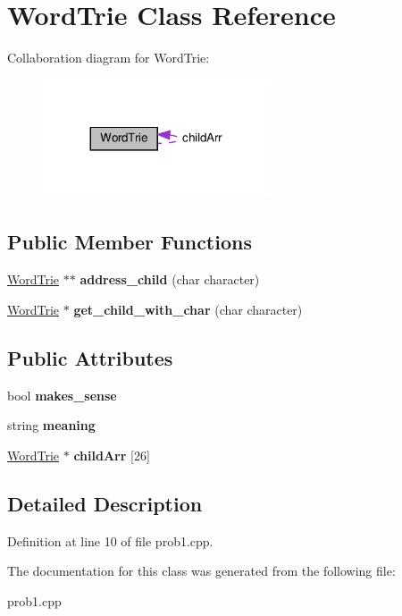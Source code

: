 \hypertarget{classWordTrie}{}\section{Word\+Trie Class Reference}
\label{classWordTrie}


Collaboration diagram for Word\+Trie\+:\nopagebreak
\begin{figure}[H]
\begin{center}
\leavevmode
\includegraphics[width=191pt]{classWordTrie__coll__graph}
\end{center}
\end{figure}
\subsection*{Public Member Functions}
\begin{DoxyCompactItemize}
\item 
\mbox{\label{classWordTrie_af0cf442ff51c7d278031cec7b3c41a57}} 
\hyperlink{classWordTrie}{Word\+Trie} $\ast$$\ast$ {\bfseries address\+\_\+child} (char character)
\item 
\mbox{\label{classWordTrie_a23f941013a4b335793cb58ffe6deb9b4}} 
\hyperlink{classWordTrie}{Word\+Trie} $\ast$ {\bfseries get\+\_\+child\+\_\+with\+\_\+char} (char character)
\end{DoxyCompactItemize}
\subsection*{Public Attributes}
\begin{DoxyCompactItemize}
\item 
\mbox{\label{classWordTrie_aa5ec850f660fbe454bfaeb8be355fd51}} 
bool {\bfseries makes\+\_\+sense}
\item 
\mbox{\label{classWordTrie_a2b8ce15c8547d563a0eae5bd3bc0de1a}} 
string {\bfseries meaning}
\item 
\mbox{\label{classWordTrie_a468b4ce929b2348bd59a5fc39a7ecf3f}} 
\hyperlink{classWordTrie}{Word\+Trie} $\ast$ {\bfseries child\+Arr} \mbox{[}26\mbox{]}
\end{DoxyCompactItemize}


\subsection{Detailed Description}


Definition at line 10 of file prob1.\+cpp.



The documentation for this class was generated from the following file\+:\begin{DoxyCompactItemize}
\item 
prob1.\+cpp\end{DoxyCompactItemize}
